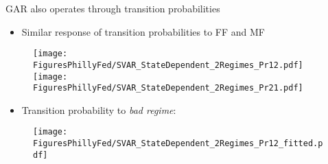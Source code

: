 \documentclass[xcolor=dvipsnames, xcolor=table, 10pt]{beamer}
\begin{document}

\begin{frame}{GAR also operates through transition probabilities}
\begin{itemize}
\item Similar response of transition probabilities to FF and MF
\end{itemize}
\begin{figure}
    \texttt{[image: FiguresPhillyFed/SVAR\_StateDependent\_2Regimes\_Pr12.pdf]}
    \texttt{[image: FiguresPhillyFed/SVAR\_StateDependent\_2Regimes\_Pr21.pdf]}
\end{figure}

\begin{itemize}
\item Transition probability to \textit{bad regime}:
\end{itemize}
\begin{figure}
    \texttt{[image: FiguresPhillyFed/SVAR\_StateDependent\_2Regimes\_Pr12\_fitted.pdf]}
\end{figure}


\end{frame}

\end{document}
